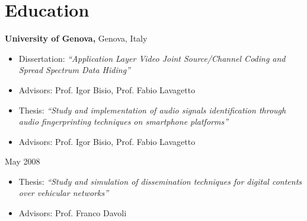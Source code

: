 

\section{Education}

\textbf{University of Genova,} Genova, Italy

\vspace{-1em}

\begin{itemize}
\item Dissertation: {\sl ``Application Layer Video Joint Source/Channel Coding and Spread Spectrum Data Hiding''}
\item Advisors: Prof. Igor Bisio, Prof. Fabio Lavagetto
\end{itemize}

\vspace{-1em}

\vspace{-1em}

\begin{itemize}
\item Thesis: {\sl ``Study and implementation of audio signals identification through audio fingerprinting techniques on smartphone platforms''}
\item Advisors: Prof. Igor Bisio, Prof. Fabio Lavagetto
\end{itemize}


 {May 2008}
\vspace{-1em}
\begin{itemize}
\item Thesis: {\sl ``Study and simulation of dissemination techniques for digital contents over vehicular networks''}
\item Advisors: Prof. Franco Davoli

\end{itemize}
